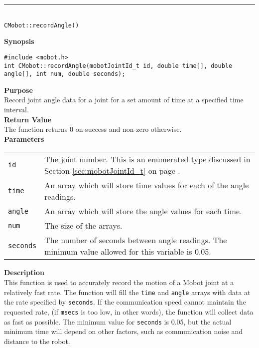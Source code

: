 \noindent
\vspace{5pt}
\rule{4.5in}{0.015in}\\
\noindent
{\LARGE \texttt{CMobot::recordAngle()}}\\
{}

\noindent
{\bf Synopsis}
\vspace{-8pt}
\begin{verbatim}
#include <mobot.h>
int CMobot::recordAngle(mobotJointId_t id, double time[], double angle[], int num, double seconds);
\end{verbatim}

\noindent
{\bf Purpose}\\
Record joint angle data for a joint for a set amount of time at a specified time interval.\\

\noindent
{\bf Return Value}\\
The function returns 0 on success and non-zero otherwise.\\

\noindent
{\bf Parameters}\\
\vspace{-0.1in}
\begin{description}
\item               
\begin{tabular}{p{15 mm}p{145 mm}}
\texttt{id} & The joint number. This is an enumerated type 
discussed in Section \ref{sec:mobotJointId_t} on page
\pageref{sec:mobotJointId_t}.\\
\texttt{time} & An array which will store time values for each of the angle readings. \\
\texttt{angle} & An array which will store the angle values for each time. \\
\texttt{num} & The size of the arrays. \\
\texttt{seconds} & The number of seconds between angle readings. The minimum value allowed for
this variable is 0.05.
\end{tabular}
\end{description}

\noindent
{\bf Description}\\
This function is used to accurately record the motion of a Mobot joint at a relatively fast
rate. The function will fill the \texttt{time} and \texttt{angle} arrays with data
at the rate specified by \texttt{seconds}. If the communication speed cannot maintain 
the requested rate, (if \texttt{msecs} is too low, in other words), the function will
collect data as fast as possible. The minimum value for \texttt{seconds} is 0.05, but
the actual minimum time will depend on other factors, such as communication noise and
distance to the robot.

